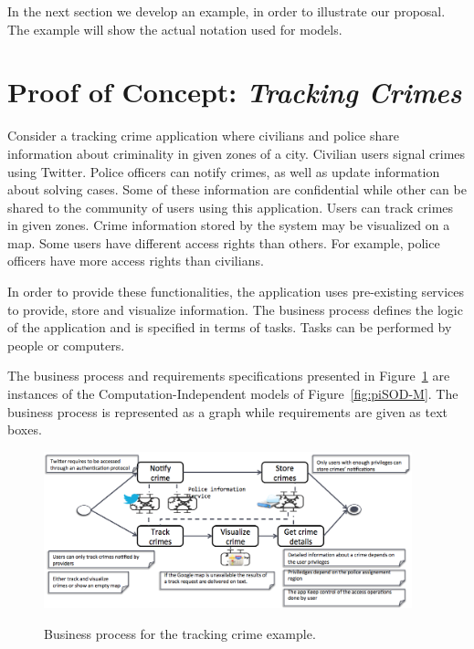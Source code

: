 \documentclass{llncs}
\theoremstyle{plain}
\theoremstyle{plain}
\theoremstyle{plain}
\begin{document}
In the next section we develop an example, in order to illustrate our proposal.
The example will show the actual notation used for models. 









\section{Proof of Concept: \textit{Tracking Crimes}}\label{sec:poc}
%


Consider a tracking crime application where civilians and police share information about criminality in given zones of a city. 
Civilian users signal crimes using Twitter.
Police officers can notify crimes, as well as update information about solving cases.
Some of these information are confidential while other can be shared
to the community of users using this application. 
Users can track crimes in given zones. 
Crime information stored by the system may be visualized on a map. 
Some users have different access rights than others.
For example, police officers have more access rights than civilians.


In order to provide these functionalities, the application uses pre-existing services to provide, store and visualize  information.
The business process defines the logic of the application and is specified in terms of tasks. 
Tasks can be performed by people or computers. 

The business process and requirements specifications presented in Figure~\ref{fig:constraints} are instances of the Computation-Independent models of Figure~\ref{fig:piSOD-M}.
The business process is represented as a graph while requirements are given as text boxes.
\begin{figure}[ht!]
\centering
{\label{fig:trans06}\includegraphics[width=0.95\textwidth]{constraints.png}}
~ %
\caption{Business process for the tracking crime example.}
\label{fig:constraints}
\end{figure}
\end{document}
